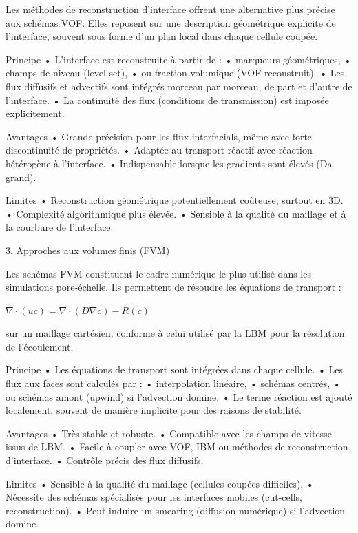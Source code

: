 \documentclass[12pt,a4paper]{report}
\begin{document}
Les méthodes de reconstruction d’interface offrent une alternative plus précise aux schémas VOF.
Elles reposent sur une description géométrique explicite de l’interface, souvent sous forme d’un plan local dans chaque cellule coupée.

Principe
	•	L’interface est reconstruite à partir de :
	•	marqueurs géométriques,
	•	champs de niveau (level-set),
	•	ou fraction volumique (VOF reconstruit).
	•	Les flux diffusifs et advectifs sont intégrés morceau par morceau, de part et d’autre de l’interface.
	•	La continuité des flux (conditions de transmission) est imposée explicitement.

Avantages
	•	Grande précision pour les flux interfacials, même avec forte discontinuité de propriétés.
	•	Adaptée au transport réactif avec réaction hétérogène à l’interface.
	•	Indispensable lorsque les gradients sont élevés (Da grand).

Limites
	•	Reconstruction géométrique potentiellement coûteuse, surtout en 3D.
	•	Complexité algorithmique plus élevée.
	•	Sensible à la qualité du maillage et à la courbure de l’interface.




3. Approches aux volumes finis (FVM)

Les schémas FVM constituent le cadre numérique le plus utilisé dans les simulations pore-échelle.
Ils permettent de résoudre les équations de transport :

$\nabla\cdot (u c) = \nabla\cdot(D \nabla c) - R(c)$

sur un maillage cartésien, conforme à celui utilisé par la LBM pour la résolution de l’écoulement.

Principe
	•	Les équations de transport sont intégrées dans chaque cellule.
	•	Les flux aux faces sont calculés par :
	•	interpolation linéaire,
	•	schémas centrés,
	•	ou schémas amont (upwind) si l’advection domine.
	•	Le terme réaction est ajouté localement, souvent de manière implicite pour des raisons de stabilité.

Avantages
	•	Très stable et robuste.
	•	Compatible avec les champs de vitesse issus de LBM.
	•	Facile à coupler avec VOF, IBM ou méthodes de reconstruction d’interface.
	•	Contrôle précis des flux diffusifs.

Limites
	•	Sensible à la qualité du maillage (cellules coupées difficiles).
	•	Nécessite des schémas spécialisés pour les interfaces mobiles (cut-cells, reconstruction).
	•	Peut induire un smearing (diffusion numérique) si l’advection domine.
\end{document}
